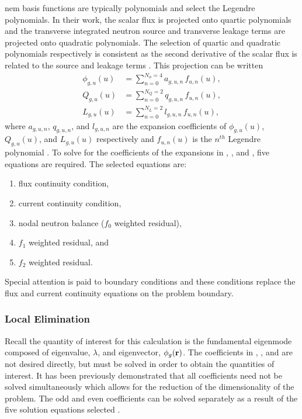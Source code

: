    \gls{nem} basis functions are typically polynomials and
    \citeauthor{qe2paper} select the Legendre polynomials. In their work, the
    scalar flux is projected onto quartic polynomials and the transverse
    integrated neutron source and transverse leakage terms are projected onto
    quadratic polynomials. The selection of quartic and quadratic polynomials
    respectively is consistent as the second derivative of the scalar flux is
    related to the source and leakage terms \cite{gehinThesis}. This projection
    can be written
    \begin{align}
      \label{eq:flux_expansion}
      \phi_{g,u}(u) &= \sum_{n=0}^{N_{\phi} = 4} a_{g,u,n} \, f_{u,n}(u), \\
      \label{eq:source_expansion}
      Q_{g,u}(u)    &= \sum_{n=0}^{N_Q = 2}      q_{g,u,n} \, f_{u,n}(u), \\
      \label{eq:leakage_expansion}
      L_{g,u}(u)    &= \sum_{n=0}^{N_L = 2}      l_{g,u,n} \, f_{u,n}(u),
    \end{align}
    where $a_{g,u,n}$, $q_{g,u,n}$, and $l_{g,u,n}$ are the expansion
    coefficients of $\phi_{g,u}(u)$, $Q_{g,u}(u)$, and $L_{g,u}(u)$ respectively
    and $f_{u,n}(u)$ is the $n^{th}$ Legendre polynomial \cite{qe2paper}. To
    solve for the coefficients of the expansions in ,
    , and , five equations
    are required. The selected equations are:
    \begin{enumerate}
      \item flux continuity condition,
      \item current continuity condition,
      \item nodal neutron balance ($f_0$ weighted residual),
      \item $f_1$ weighted residual, and
      \item $f_2$ weighted residual.
    \end{enumerate}
    Special attention is paid to boundary conditions and these conditions 
    replace the flux and current continuity equations on the problem boundary.

    \subsubsection{Local Elimination}
      \label{sec:local_elimination}

      Recall the quantity of interest for this calculation is the fundamental
      eigenmode composed of eigenvalue, $\lambda$, and eigenvector,
      $\phi_g(\mathbf{r})$. The coefficients in ,
      , and  are not
      desired directly, but must be solved in order to obtain the quantities of
      interest. It has been previously demonstrated that all coefficients need
      not be solved simultaneously which allows for the reduction of the
      dimensionality of the problem. The odd and even coefficients can be solved
      separately as a result of the five solution equations selected
      \cite{gehinThesis}.
      
